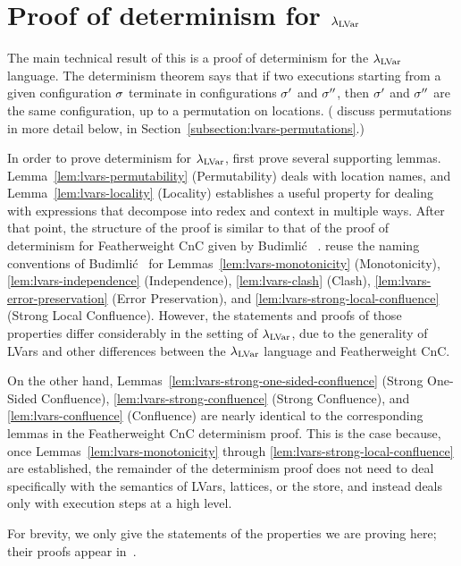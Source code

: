 \section{Proof of determinism for $\lambda_{\textrm{LVar}}$}\label{s:lvars-proof}

The main technical result of this  is a proof of determinism
for the $\lambda_{\textrm{LVar}}$ language.  The determinism theorem says that if
two executions starting from a given configuration $\sigma$ terminate
in configurations $\sigma'$ and $\sigma''$, then $\sigma'$ and $\sigma''$
are the same configuration, up to a permutation on locations.  (
discuss permutations in more detail below, in
Section~\ref{subsection:lvars-permutations}.)

In order to prove determinism for $\lambda_{\textrm{LVar}}$,  first prove several
supporting lemmas.  Lemma~\ref{lem:lvars-permutability}
(Permutability) deals with location names, and
Lemma~\ref{lem:lvars-locality} (Locality) establishes a useful
property for dealing with expressions that decompose into redex and
context in multiple ways.  After that point, the structure of the
proof is similar to that of the proof of determinism for Featherweight
CnC given by Budimli\'c \etal~.   reuse the naming
conventions of Budimli\'c \etal~for
Lemmas~\ref{lem:lvars-monotonicity} (Monotonicity),
\ref{lem:lvars-independence} (Independence), \ref{lem:lvars-clash}
(Clash), \ref{lem:lvars-error-preservation} (Error Preservation), and
\ref{lem:lvars-strong-local-confluence} (Strong Local
Confluence). However, the statements and proofs of those properties
differ considerably in the setting of $\lambda_{\textrm{LVar}}$, due to the
generality of LVars and other differences between the $\lambda_{\textrm{LVar}}$
language and Featherweight CnC.

On the other hand, Lemmas~\ref{lem:lvars-strong-one-sided-confluence}
(Strong One-Sided Confluence), \ref{lem:lvars-strong-confluence}
(Strong Confluence), and \ref{lem:lvars-confluence} (Confluence) are
nearly identical to the corresponding lemmas in the Featherweight CnC
determinism proof.  This is the case because, once
Lemmas~\ref{lem:lvars-monotonicity} through
\ref{lem:lvars-strong-local-confluence} are established, the remainder
of the determinism proof does not need to deal specifically with the
semantics of LVars, lattices, or the store, and instead deals only
with execution steps at a high level.

\ifdefined\JOURNAL
For brevity, we only give the statements of the properties we are
proving here; their proofs appear in~\cite{lvars-dissertation}.
\fi

